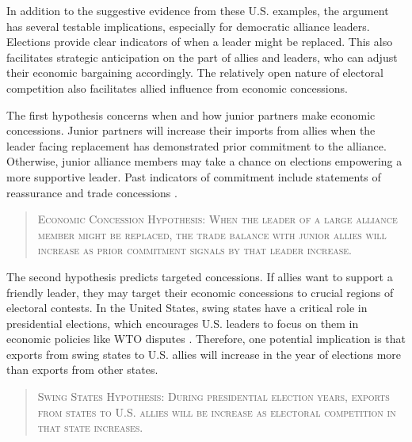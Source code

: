 \documentclass[12pt]{article}
\begin{document}
In addition to the suggestive evidence from these U.S. examples, the argument has several testable implications, especially for democratic alliance leaders.
Elections provide clear indicators of when a leader might be replaced. 
This also facilitates strategic anticipation on the part of allies and leaders, who can adjust their economic bargaining accordingly. 
The relatively open nature of electoral competition also facilitates allied influence from economic concessions. 


The first hypothesis concerns when and how junior partners make economic concessions. 
Junior partners will increase their imports from allies when the leader facing replacement has demonstrated prior commitment to the alliance. 
Otherwise, junior alliance members may take a chance on elections empowering a more supportive leader. 
Past indicators of commitment include statements of reassurance \citep{Blankenship2020} and trade concessions \citep{WolfordKim2017}.


\begin{quote}
\textsc{Economic Concession Hypothesis: When the leader of a large alliance member might be replaced, the trade balance with junior allies will increase as prior commitment signals by that leader increase.}
\end{quote}



The second hypothesis predicts targeted concessions.
If allies want to support a friendly leader, they may target their economic concessions to crucial regions of electoral contests. 
In the United States, swing states have a critical role in presidential elections, which encourages U.S. leaders to focus on them in economic policies like WTO disputes \citep{Conconietal2017}.
Therefore, one potential implication is that exports from swing states to U.S. allies will increase in the year of elections more than exports from other states.

\begin{quote}
\textsc{Swing States Hypothesis: During presidential election years, exports from states to U.S. allies will be increase as electoral competition in that state increases.}
\end{quote}

%
%
%
\end{document}
